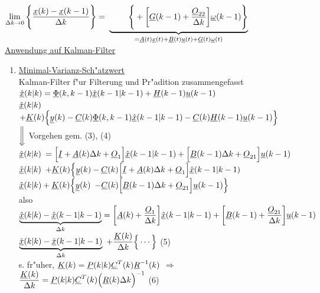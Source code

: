\documentclass[openany,a4paper,11pt]{book}
\begin{document}
{\color{white}$\displaystyle\mathop{\text{lim}}\limits_{\Delta k\rightarrow0}\Bigg\{\frac{\uline{x}(k)-\uline{x}(k-1)}{\Delta k}\Bigg\}=$} $\underbrace{{\color{white}\mathop{\text{lim}}\limits_{\Delta k\rightarrow0}}\Bigg\{+\bigg[\uline{G}(k-1)+\frac{\uline{O}_{22}}{\Delta k}\bigg]\uline{\omega}(k-1)\Bigg\}}_{=\uline{A}(t)\uline{x}(t)+\uline{B}(t)\uline{u}(t)+\uline{G}(t)\uline{\omega}(t)}$\\
\clearpage
\uline{Anwendung auf Kalman-Filter}\\\begin{enumerate}
    \item \uline{Minimal-Varianz-Sch"atzwert}\\
    Kalman-Filter f"ur Filterung und Pr"adition zusammengefasst\\
    $\uline{\hat{x}}(k|k)=\uline{\Phi}(k,k-1)\uline{\hat{x}}(k-1|k-1)+\uline{H}(k-1)\uline{u}(k-1)$\\
    {\color{white}$\uline{\hat{x}}(k|k)$} $+\uline{K}(k)\Big\{ \uline{y}(k)-\uline{C}(k)\uline{\Phi}(k,k-1)\uline{\hat{x}}(k-1|k-1)-\uline{C}(k)\uline{H}(k-1)\uline{u}(k-1)\Big\}$\\
    \qquad \qquad $\bigg\Downarrow$ Vorgehen gem. (3), (4)\\
    {\color{white}$\uline{\hat{x}}(k|k)$} $=\Big[\uline{I}+\uline{A}(k)\Delta k +\uline{O}_1\Big]\uline{\hat{x}}(k-1|k-1)+\Big[\uline{B}(k-1)\Delta k+\uline{O}_{21}\Big]\uline{u}(k-1)$\\
    {\color{white}$\uline{\hat{x}}(k|k)$} $+\uline{K}(k)\Big\{ \uline{y}(k)-\uline{C}(k)\Big[\uline{I}+\uline{A}(k)\Delta k +\uline{O}_1\Big]\uline{\hat{x}}(k-1|k-1)$\\
    {\color{white}$\uline{\hat{x}}(k|k)+\uline{K}(k)\Big\{ \uline{y}(k)$} $-\uline{C}(k)\Big[\uline{B}(k-1)\Delta k+\uline{O}_{21}\Big]\uline{u}(k-1)\Big\}$\\
    also\\
    $\displaystyle\underbrace{\uline{\hat{x}}(k|k)-\uline{\hat{x}}(k-1|k-1)}_{\Delta k}=\bigg[\uline{A}(k)+\frac{\uline{O}_1}{\Delta k}\bigg]\uline{\hat{x}}(k-1|k-1)+\bigg[\uline{B}(k-1)+\frac{\uline{O}_{21}}{\Delta k}\bigg]\uline{u}(k-1)$\\
    {\color{white}$\displaystyle\underbrace{\uline{\hat{x}}(k|k)-\uline{\hat{x}}(k-1|k-1)}_{\Delta k}$} $\displaystyle+\frac{\uline{K}(k)}{\Delta k}\Big\{\cdots\Big\}$ \quad (5)\\
    s. fr"uher, $\uline{K}(k)=\uline{P}(k|k)\uline{C}^T(k)\uline{R}^{-1}(k)$ $\Rightarrow$ $\displaystyle\frac{\uline{K}(k)}{\Delta k}=\uline{P}(k|k)\uline{C}^T(k)\Big(\uline{R}(k)\Delta k\Big)^{-1}$ \quad (6)\\[3pt]

\end{enumerate}
\end{document}

